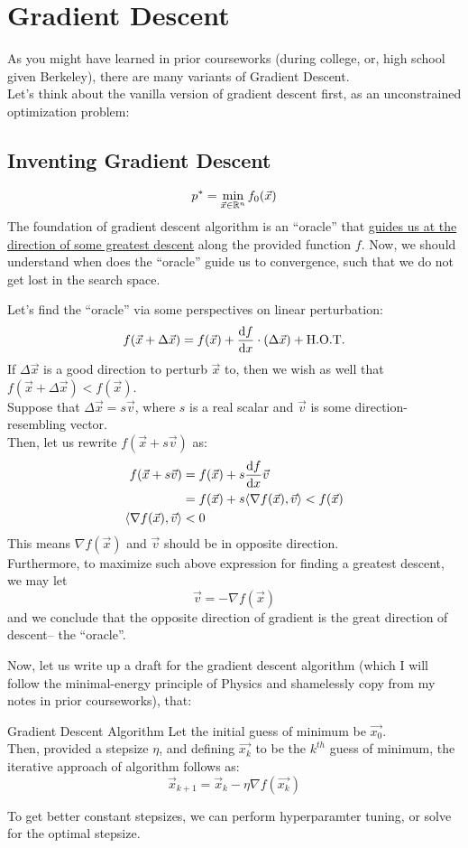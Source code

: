 \section{Gradient Descent}
As you might have learned in prior courseworks (during college, or, high school given Berkeley), there are many variants of Gradient Descent. \\
Let's think about the vanilla version of gradient descent first, as an unconstrained optimization problem:

\subsection{Inventing Gradient Descent}
\[
    p^* = \min_{\vec{x} \in \mathbb{R}^n} f_0(\vec{x})
\]
The foundation of gradient descent algorithm is an ``oracle'' that \underline{guides us at the direction of some greatest descent} along the provided function $f$.
Now, we should understand when does the ``oracle'' guide us to convergence, such that we do not get lost in the search space.
\par
Let's find the ``oracle'' via some perspectives on linear perturbation:
\begin{align*}
    f(\vec{x} + \Delta \vec{x}) = f(\vec{x}) + \dv{f}{x} \cdot (\Delta \vec{x}) + \text{H.O.T.}
\end{align*}
If $\Delta \vec{x}$ is a good direction to perturb $\vec{x}$ to, then we wish as well that $f(\vec{x} + \Delta \vec{x}) < f(\vec{x})$. \\
Suppose that $\Delta \vec{x} = s \vec{v}$, where $s$ is a real scalar and $\vec{v}$ is some direction-resembling vector. \\
Then, let us rewrite $f(\vec{x} + s \vec{v})$ as:
\begin{align*}
    f(\vec{x} + s \vec{v})
    &= f(\vec{x}) + s \dv{f}{x} {} \vec{v} \\
    &= f(\vec{x}) + s \langle \nabla f(\vec{x}), \vec{v} \rangle < f(\vec{x}) \\
    \langle \nabla f(\vec{x}), \vec{v} \rangle &< 0
\end{align*}
This means $\nabla f(\vec{x})$ and $\vec{v}$ should be in opposite direction. \\
Furthermore, to maximize such above expression for finding a greatest descent, we may let
\[
    \vec{v} = - \nabla f(\vec{x})
\]
and we conclude that the opposite direction of gradient is the great direction of descent-- the ``oracle''.
\par
Now, let us write up a draft for the gradient descent algorithm (which I will follow the minimal-energy principle of Physics and shamelessly copy from my notes in prior courseworks), that:
\begin{ln-define}{Gradient Descent Algorithm}{}
    Let the initial guess of minimum be $\vec{x_0}$. \\
    Then, provided a stepsize $\eta$, and defining $\vec{x_k}$ to be the $k^{th}$ guess of minimum, the iterative approach of algorithm follows as:
    \[
        \vec{x}_{k + 1} = \vec{x}_k - \eta \nabla f(\vec{x_k})
    \]
\end{ln-define}
To get better constant stepsizes, we can perform hyperparamter tuning, or solve for the optimal stepsize.

